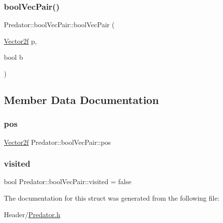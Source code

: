 \mbox{\label{struct_predator_1_1bool_vec_pair_a88e6533da82d617911adaa137711f954}} 
\subsubsection{\texorpdfstring{boolVecPair()}{boolVecPair()}\hspace{0.1cm}{\footnotesize\ttfamily [2/2]}}
{\footnotesize\ttfamily Predator\+::bool\+Vec\+Pair\+::bool\+Vec\+Pair (\begin{DoxyParamCaption}\item[{\mbox{\hyperlink{class_vector2f}{Vector2f}}}]{p,  }\item[{bool}]{b }\end{DoxyParamCaption})\hspace{0.3cm}{\ttfamily [inline]}}



\subsection{Member Data Documentation}
\mbox{\label{struct_predator_1_1bool_vec_pair_a9a60ae55f2b32cb24460122ec03386f0}} 
\subsubsection{\texorpdfstring{pos}{pos}}
{\footnotesize\ttfamily \mbox{\hyperlink{class_vector2f}{Vector2f}} Predator\+::bool\+Vec\+Pair\+::pos}

\mbox{\label{struct_predator_1_1bool_vec_pair_ab8fb68ccbeae03dc1eef4563d16dcb78}} 
\subsubsection{\texorpdfstring{visited}{visited}}
{\footnotesize\ttfamily bool Predator\+::bool\+Vec\+Pair\+::visited = false}



The documentation for this struct was generated from the following file\+:\begin{DoxyCompactItemize}
\item 
Header/\mbox{\hyperlink{_predator_8h}{Predator.\+h}}\end{DoxyCompactItemize}
